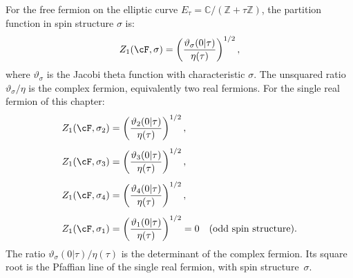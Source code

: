 \begin{theorem}
\label{thm:fermion-genus1-partition}
For the free fermion on the elliptic curve
$E_\tau = \mathbb{C}/(\mathbb{Z} + \tau\mathbb{Z})$,
the partition function in spin structure $\sigma$ is:
\begin{equation}\label{eq:fermion-Z1-spin}
Z_1(\cF, \sigma)
= \left(\frac{\vartheta_\sigma(0|\tau)}{\eta(\tau)}\right)^{1/2},
\end{equation}
where $\vartheta_\sigma$ is the Jacobi theta function with
characteristic $\sigma$. The unsquared ratio
$\vartheta_\sigma/\eta$ is the complex fermion, equivalently two
real fermions. For the single real fermion of this chapter:
\begin{align}
\label{eq:fermion-Z1-theta2}
Z_1(\cF, \sigma_2) &=
\left(\frac{\vartheta_2(0|\tau)}{\eta(\tau)}\right)^{1/2}, \\[4pt]
\label{eq:fermion-Z1-theta3}
Z_1(\cF, \sigma_3) &=
\left(\frac{\vartheta_3(0|\tau)}{\eta(\tau)}\right)^{1/2}, \\[4pt]
\label{eq:fermion-Z1-theta4}
Z_1(\cF, \sigma_4) &=
\left(\frac{\vartheta_4(0|\tau)}{\eta(\tau)}\right)^{1/2}, \\[4pt]
\label{eq:fermion-Z1-odd}
Z_1(\cF, \sigma_1) &=
\left(\frac{\vartheta_1(0|\tau)}{\eta(\tau)}\right)^{1/2} = 0
\quad \text{\textup{(}odd spin structure\textup{)}}.
\end{align}
The ratio $\vartheta_\sigma(0|\tau)/\eta(\tau)$ is the determinant
of the complex fermion. Its square root is the Pfaffian line of the
single real fermion, with spin structure~$\sigma$.
\end{theorem}

